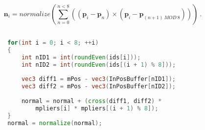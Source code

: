 		\begin{equation}
		\mathbf{n}_{i} = normalize( \sum_{n = 0}^{n < 8} ( (\mathbf{p}_{i} - \mathbf{p}_{n}) \times (\mathbf{p}_{i} - \mathbf{p}_{(n+1)\ MOD\ 8}) ) ) \ .
		\end{equation}
		\newline
		
		\begin{lstlisting}[language=GLSL,caption={Przeliczenie wektorów normalnych.},label={lst_5_5}]
		
		for(int i = 0; i < 8; ++i)
		{
			int nID1 = int(roundEven(ids[i]));
			int nID2 = int(roundEven(ids[(i + 1) % 8]));
			
			vec3 diff1 = mPos - vec3(InPosBuffer[nID1]);
			vec3 diff2 = mPos - vec3(InPosBuffer[nID2]);
			
			normal = normal + (cross(diff1, diff2) * 
				mpliers[i] * mpliers[(i + 1) % 8]);
		}
		normal = normalize(normal);
		
		\end{lstlisting}
		\newpage
		
	
